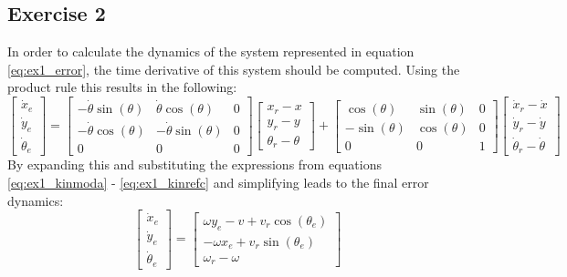 \subsection{Exercise 2}
In order to calculate the dynamics of the system represented in equation \eqref{eq:ex1_error}, the time derivative of this system should be computed. Using the product rule this results in the following:
\begin{equation}
    \begin{bmatrix}
    \dot{x}_e \\
    \dot{y}_e \\
    \dot{\theta}_e
    \end{bmatrix}
    =
    \begin{bmatrix}
    -\dot{\theta} \sin(\theta) & \dot{\theta} \cos(\theta) & 0 \\
    -\dot{\theta}\cos(\theta) & -\dot{\theta}\sin(\theta) & 0 \\
    0 & 0 & 0
    \end{bmatrix}
    \begin{bmatrix}
    x_r - x\\
    y_r - y\\
    \theta_r - \theta
    \end{bmatrix}
    +
    \begin{bmatrix}
    \cos(\theta) & \sin(\theta) & 0 \\
    -\sin(\theta) & \cos(\theta) & 0 \\
    0 & 0 & 1
    \end{bmatrix}
    \begin{bmatrix}
    \dot{x}_r - \dot{x}\\
    \dot{y}_r - \dot{y}\\
    \dot{\theta}_r - \dot{\theta}
    \end{bmatrix}
    \label{eq:ex2_dt}
\end{equation}
By expanding this and substituting the expressions from equations \eqref{eq:ex1_kinmoda} - \eqref{eq:ex1_kinrefc} and simplifying leads to the final error dynamics:
\begin{equation}
\begin{bmatrix}
\dot{x}_e \\
\dot{y}_e \\
\dot{\theta}_e
\end{bmatrix}
=
\begin{bmatrix}
\omega y_e - v + v_r \cos(\theta_e) \\
-\omega x_e + v_r \sin(\theta_e) \\
\omega_r - \omega
\end{bmatrix}
\label{eq:ex2_errordyn}
\end{equation}



